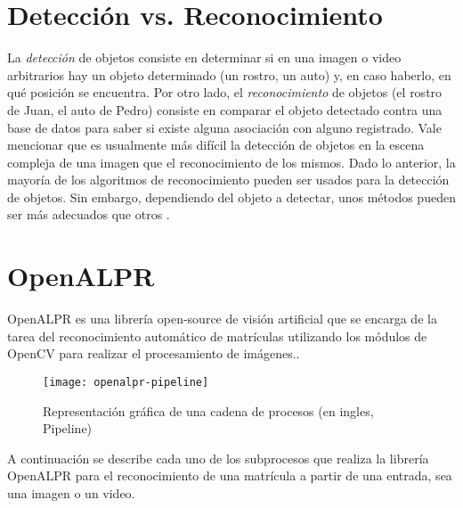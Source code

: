 \section{Detección vs. Reconocimiento}
La\textit{ detección} de objetos consiste en determinar si en una imagen o video arbitrarios hay un objeto determinado (un rostro, un auto) y, en caso haberlo, en qué posición se encuentra. Por otro lado, el \textit{reconocimiento }de objetos (el rostro de Juan, el auto de Pedro) consiste en comparar el objeto detectado contra una base de datos para saber si existe alguna asociación con alguno registrado. Vale mencionar que es usualmente más difícil la detección de objetos en la escena compleja de una imagen que el reconocimiento de los mismos. Dado lo anterior, la mayoría de los algoritmos de reconocimiento pueden ser usados para la detección de objetos. Sin embargo, dependiendo del objeto a detectar, unos métodos pueden ser más adecuados que otros \cite{Ekvall2005-ut}.
\section{OpenALPR}
OpenALPR es una librería open-source de visión artificial que se encarga de la tarea del reconocimiento automático de matrículas utilizando los módulos de OpenCV para realizar el procesamiento de imágenes..
  
  \begin{figure}[H]
        \centering
        \texttt{[image: openalpr-pipeline]}
        \caption{Representación gráfica de una cadena de procesos (en ingles, Pipeline) \protect\cite{Saini2015-yp}}
        \label{fig:openalpr-pipeline}
\end{figure}
    
A continuación se describe cada uno de los subprocesos que realiza la librería OpenALPR para el reconocimiento de una matrícula a partir de una entrada, sea una imagen o un video. 

